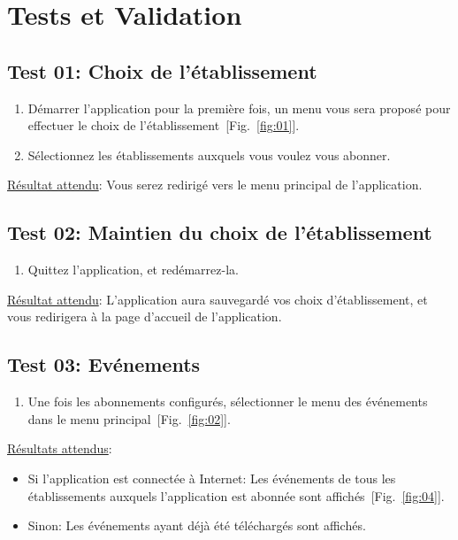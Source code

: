 \documentclass [pdftex,12pt] {report}
\begin{document}
\chapter{Tests et Validation}
  
  \section{Test 01: Choix de l'établissement}
    \begin{enumerate}
    \item Démarrer l'application pour la première fois, un menu vous sera proposé pour effectuer le choix de l'établissement~[Fig.~\ref{fig:01}].
    \item Sélectionnez les établissements auxquels vous voulez vous abonner.
    \end{enumerate}

    \underline{Résultat attendu}: Vous serez redirigé vers le menu principal de l'application.

  \section{Test 02: Maintien du choix de l'établissement}
    \begin{enumerate}
    \item Quittez l'application, et redémarrez-la.
    \end{enumerate}

    \underline{Résultat attendu}: L'application aura sauvegardé vos choix d'établissement, et vous redirigera à la page d'accueil de l'application.

  \section{Test 03: Evénements}
    \begin{enumerate}
    \item Une fois les abonnements configurés, sélectionner le menu des événements dans le menu principal~[Fig.~\ref{fig:02}].
    \end{enumerate}

    \underline{Résultats attendus}:
    \begin{itemize}
    \item Si l'application est connectée à Internet: Les événements de tous les établissements auxquels l'application est abonnée sont affichés~[Fig.~\ref{fig:04}].
    \item Sinon: Les événements ayant déjà été téléchargés sont affichés.
    \end{itemize}
\end{document}
